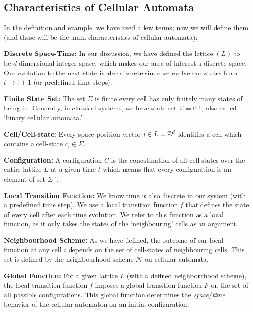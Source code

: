\documentclass[11pt, oneside, listof=totoc]{scrbook}
\begin{document}
\subsection{Characteristics of Cellular Automata}

In the definition and example, we have used a few terms; now we will define them (and these will be the main characteristics of cellular automata):
\begin{list}{}{}
    \item[\bfseries Discrete Space-Time:] In our discussion, we have defined the lattice \((L)\) to be \(d\)-dimensional integer space, which makes our area of interest a discrete space. Our evolution to the next state is also discrete since we evolve our states from \(t \to t+1\) (or predefined time steps).

    \item[\bfseries Finite State Set:] The set \(\Sigma\) is finite \ie every cell has only finitely many states of being in. Generally, in classical systems, we have state set \(\Sigma = \qty{0, 1}\), also called `binary cellular automata.'

    \item[\bfseries Cell/Cell-state:] Every space-position vector \(i \in L = \mathbb Z^d\) identifies a cell which contains a cell-state \(c_i \in \Sigma\).

    \item[\bfseries Configuration:] A configuration \(C\) is the concatination of all cell-states over the entire lattice \(L\) at a given time \(t\) which means that every configuration is an element of set \(\Sigma^L\).

    \item[\bfseries Local Transition Function:] We know time is also discrete in our system (with a predefined time step). We use a local transition function \(f\) that defines the state of every cell after each time evolution. We refer to this function as a local function, as it only takes the states of the `neighbouring' cells as an argument.

    \item[\bfseries Neighbourhood Scheme:] As we have defined, the outcome of our local function at any cell \(i\) depends on the set of cell-states of neighbouring cells. This set is defined by the neighbourhood scheme \(\mathcal{N}\) on cellular automata.

    \item[\bfseries Global Function:] For a given lattice \(L\) (with a defined neighbourhood scheme), the local transition function \(f\) imposes a global transition function \(F\) on the set of all possible configurations. This global function determines the \emph{space}/\emph{time} behavior of the cellular automaton on an initial configuration.
\end{list}
\end{document}
